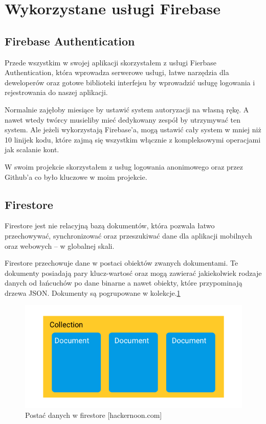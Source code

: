 \section{Wykorzystane usługi Firebase}

\subsection{Firebase Authentication}

Przede wszystkim w swojej aplikacji skorzystałem z usługi Fierbase Authentication,
która wprowadza serwerowe usługi,
łatwe narzędzia dla deweloperów oraz gotowe biblioteki interfejsu by wprowadzić usługę logowania i rejestrowania do naszej aplikacji.

Normalnie zajęłoby miesiące by ustawić system autoryzacji na własną rękę.
A nawet wtedy twórcy musieliby mieć dedykowany zespół by utrzymywać ten system.
Ale jeżeli wykorzystają Firebase’a, mogą ustawić cały system w mniej niż 10 linijek kodu,
które zajmą się wszystkim włącznie z kompleksowymi operacjami jak scalanie kont.

W swoim projekcie skorzystałem z usług logowania anonimowego oraz przez Github’a co było kluczowe w moim projekcie.

\subsection{Firestore}

Firestore jest nie relacyjną bazą dokumentów, która pozwala łatwo przechowywać,
synchronizować oraz przeszukiwać dane dla aplikacji mobilnych oraz webowych – w globalnej skali.

Firestore przechowuje dane w postaci obiektów zwanych dokumentami.
Te dokumenty posiadają pary klucz-wartosć oraz mogą zawierać jakiekolwiek rodzaje danych od łańcuchów po dane binarne a nawet obiekty,
które przypominają drzewa JSON\@. Dokumenty są pogrupowane w kolekcje.\ref{rys:firestoreData}

\begin{figure}
	\centering\includegraphics[width=.6\textwidth]{img/firestoreData}
	\caption{Postać danych w firestore [hackernoon.com]}\label{rys:firestoreData}%
\end{figure}

